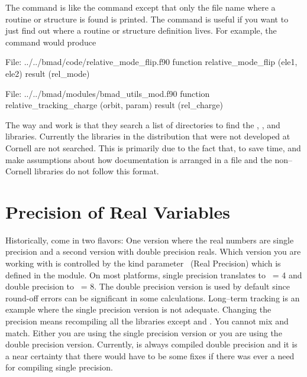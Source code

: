 {{{{{{The  command is like the  command except that only
the file name where a routine or structure is found is printed.
The  command is useful if you
want to just find out where a routine or structure definition lives.
For example, the  command would produce
\begin{example}
  File: ../../bmad/code/relative_mode_flip.f90
      function relative_mode_flip (ele1, ele2) result (rel_mode)

  File: ../../bmad/modules/bmad_utils_mod.f90
      function relative_tracking_charge (orbit, param) result (rel_charge)
\end{example}

The way  and  work is that they search a list of
directories to find the , , and 
libraries. Currently the libraries in the \bmad distribution that were
not developed at Cornell are not searched. This is primarily due to
the fact that, to save time,  and  make assumptions
about how documentation is arranged in a file and the non--Cornell libraries 
do not follow this format.

\section{Precision of Real Variables}
\label{s:precision}


Historically, \bmad come in two flavors: One version where the real
numbers are single precision and a second version with double
precision reals. Which version you are working with is controlled by
the kind parameter \ (Real Precision) which is defined in the
 module. On most platforms, single precision
translates to \ = 4 and double precision to \ = 8. The
double precision version is used by default since round-off errors can
be significant in some calculations. Long--term tracking is an example
where the single precision version is not adequate. Changing the
precision means recompiling all the libraries except  and
.  You cannot mix and match. Either you are using the
single precision version or you are using the double precision
version. Currently, \bmad is always compiled double precision and it
is a near certainty that there would have to be some fixes if there
was ever a need for compiling single precision.

}}}}}}
